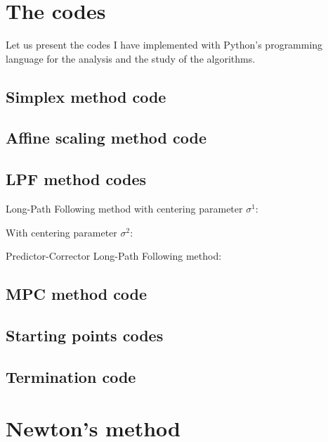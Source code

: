 \documentclass[a4paper,10 pt,titlepage,twoside]{book}
\theoremstyle{plain}
\theoremstyle{definition}
\theoremstyle{remark}
\begin{document}
{{\chapter{The codes}	
 Let us present the codes I have implemented with Python's programming language for the analysis and the study of the algorithms.
 \section{Simplex method code}\label{app:A.1}
 
 \section{Affine scaling method code}
 
 \section{LPF method codes}
 Long-Path Following method with centering parameter $\sigma^{1}$:
 
With centering parameter $\sigma^{2}$:
 
Predictor-Corrector Long-Path Following method: 
 
\section{MPC method code}

\newpage
\section{Starting points codes}
 
 
\section{Termination code}
 
	\chapter{Newton's method}
}}
\end{document}
